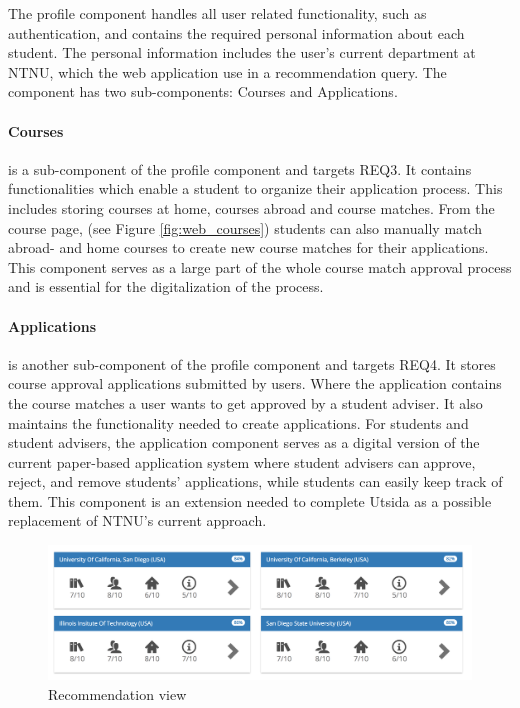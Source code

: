 The profile component handles all user related functionality, such as authentication, and contains the required personal information about each student. The personal information includes the user's current department at NTNU, which the web application use in a recommendation query. The component has two sub-components: Courses and Applications.

\paragraph{Courses} 
is a sub-component of the profile component and targets REQ3. It contains functionalities which enable a student to organize their application process. This includes storing courses at home, courses abroad and course matches. From the course page, (see Figure \ref{fig:web_courses}) students can also manually match abroad- and home courses to create new course matches for their applications. This component serves as a large part of the whole course match approval process and is essential for the digitalization of the process.

\paragraph{Applications} 
is another sub-component of the profile component and targets REQ4. It stores course approval applications submitted by users. Where the application contains the course matches a user wants to get approved by a student adviser. It also maintains the functionality needed to create applications. For students and student advisers, the application component serves as a digital version of the current paper-based application system where student advisers can approve, reject, and remove students' applications, while students can easily keep track of them. This component is an extension needed to complete Utsida as a possible replacement of NTNU's current approach.

\begin{figure}[h]
    \centering
    \includegraphics[width=1\textwidth]{fig/utsida_screenshots/result_1_cut_high.png}
    \caption{Recommendation view}
    \label{fig:web_results_1}
\end{figure}

